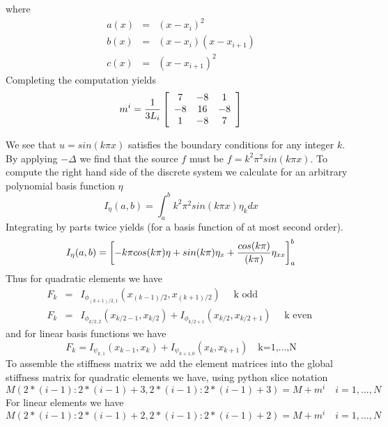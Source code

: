 \documentclass[10pt,dvips,twoside,reqno]{amsart}
\begin{document}
where
\begin{eqnarray}
a(x) &=& (x-x_i)^2 \\
b(x) &=& (x-x_i)(x-x_{i+1})\\
c(x) &=& (x-x_{i+1})^2
\end{eqnarray}
Completing the computation yields
\begin{equation}
m^i = \frac{1}{3L_i}\left[ \begin{array}{ccc}
7 & -8 & 1 \\
-8 & 16 & -8 \\
1 & -8 & 7
\end{array} \right]
\end{equation}


We see that $u=sin(k \pi x)$ satisfies the boundary conditions for any integer $k$. By applying $-\Delta$ we find that the source $f$ must be $f=k^2 \pi^2 sin(k \pi x)$. To compute the right hand side of the discrete system we calculate for an arbitrary polynomial basis function $\eta$
\begin{equation}
I_{\eta}(a,b) = \int_a^b k^2 \pi^2 sin(k \pi x) \eta_k dx
\end{equation}
Integrating by parts twice yields (for a basis function of at most second order).
\begin{equation}
I_{\eta}(a,b) = \left[-k \pi cos(k \pi) \eta + sin(k \pi) \eta_x + \frac{cos(k \pi)}{(k \pi)} \eta_{xx} \right]_a^b
\end{equation}
Thus for quadratic elements we have
\begin{eqnarray}
F_k &=& I_{\phi_{(k+1)/2,1}}(x_{(k-1)/2},x_{(k+1)/2}) \quad \mbox{ k odd } \\
F_k &=& I_{\phi_{k/2,2}}(x_{k/2-1},x_{k/2}) + I_{\phi_{k/2+1}}(x_{k/2},x_{k/2+1})\quad \mbox{ k even } 
\end{eqnarray}
and for linear basis functions we have
\begin{equation}
F_k = I_{\psi_{k,1}}(x_{k-1},x_{k})+I_{\psi_{k+1,0}}(x_{k},x_{k+1}) \quad \mbox{k=1,\ldots,N}
\end{equation}
To assemble the stiffness matrix we add the element matrices into the global stiffness matrix for quadratic elements we have, using python slice notation
\begin{equation}
M(2*(i-1):2*(i-1)+3,2*(i-1):2*(i-1)+3) = M + m^i \quad i=1,\ldots,N
\end{equation}
For linear elements we have
\begin{equation}
M(2*(i-1):2*(i-1)+2,2*(i-1):2*(i-1)+2) = M + m^i \quad i=1,\dots,N
\end{equation}
\end{document}
